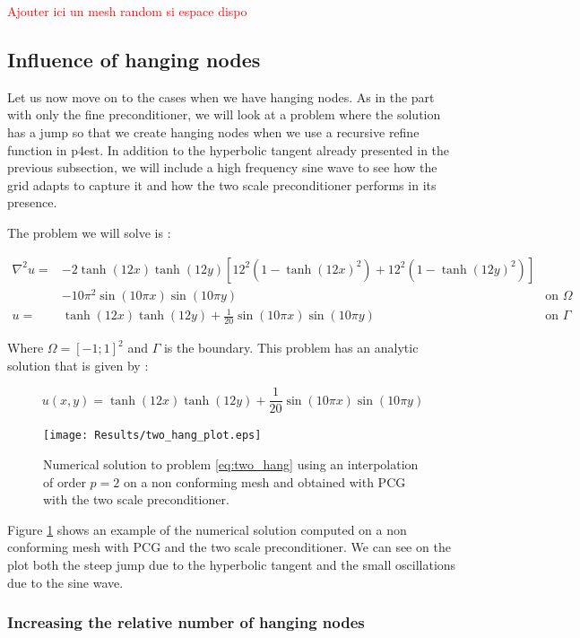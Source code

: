 \textcolor{red}{Ajouter ici un mesh random si espace dispo}

\subsection{Influence of hanging nodes}

Let us now move on to the cases when we have hanging nodes. As in the part with only the fine preconditioner, we will look at a problem where the solution has a jump so that we create hanging nodes when we use a recursive refine function in p4est. In addition to the hyperbolic tangent already presented in the previous subsection, we will include a high frequency sine wave to see how the grid adapts to capture it and how the two scale preconditioner performs in its presence. 

The problem we will solve is : 

\begin{align}
\nabla^2 u =& -2\tanh(12x)\tanh(12y)\left[ 12^2(1-\tanh(12x)^2) + 12^2(1-\tanh(12y)^2)\right] \nonumber \\
 &-  10\pi^2\sin(10\pi x)\sin(10\pi y) &\text{on $\Omega$} \label{eq:two_hang}\\
u =&   \tanh(12x)\tanh(12y) + \frac{1}{20}\sin(10\pi x)\sin(10\pi y)&\text{on $\Gamma$}
\end{align}

Where $\Omega = [-1;1]^2$ and $\Gamma$ is the boundary. This problem has an analytic solution that is given by : 

$$u(x,y) = \tanh(12x)\tanh(12y) + \frac{1}{20}\sin(10\pi x)\sin(10\pi y)$$

\begin{figure}
\centering
\texttt{[image: Results/two\_hang\_plot.eps]}
\caption{Numerical solution to problem \ref{eq:two_hang} using an interpolation of order $p=2$ on a non conforming mesh and obtained with PCG with the two scale preconditioner.}
\label{two_hang_plot}
\end{figure}

Figure \ref{two_hang_plot} shows an example of the numerical solution computed on a non conforming mesh with PCG and the two scale preconditioner. We can see on the plot both the steep jump due to the hyperbolic tangent and the small oscillations due to the sine wave.

\subsubsection{Increasing the relative number of hanging nodes}

